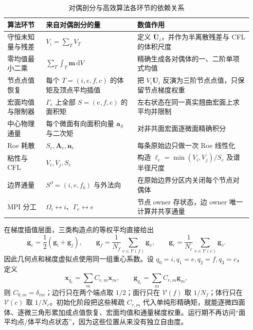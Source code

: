 \documentclass[UTF8,a4paper,11pt,openany]{ctexrep}
\numberwithin{equation}{chapter}
\newcommand{\dd}{\,\mathrm d}
\newcommand{\Ubar}{\overline{\bm U}}
\begin{document}
\begin{table}[htbp]
\centering
\caption{对偶剖分与高效算法各环节的依赖关系}
\label{tab:dual-dependency}
\begin{tabularx}{\textwidth}{>{\raggedright\arraybackslash}p{}X X}
\toprule
算法环节 & 来自对偶剖分的量 & 数值作用\\
\midrule
守恒未知量与残差 & $V_i=\sum_TV_T$ & 定义 $\Ubar_i$，并作为半离散残差与 CFL 的体积尺度\\
零均值最小二乘 & $\sum_T\int_T\bm m\dd V$ & 精确生成各对偶体的一、二阶单项式均值\\
节点点值恢复 & 每个 $T=(i,e,f,c)$ 的体矩及顶点平均插值 & 把 $V_i\Ubar_i$ 反演为三阶节点点值，只保留节点梯度权重\\
宏面均值与限制器 & $\Gamma_e$ 上全部 $S=(e,f,c)$ 的面积矩 & 左右状态在同一真实翘曲宏面上求平均并限制\\
中心物理通量 & 每个微面有向面积向量 $\bm a_S$ 与二次矩 & 对非共面宏面逐微面精确积分\\
Roe 耗散 & $S_e,\bm A_e,\bm n_e$ & 每条原始边只做一次 Roe 线性化\\
粘性与 CFL & $V_i,V_j,S_e$ & 构造 $\ell_e=\min(V_i,V_j)/S_e$ 及谱半径尺度\\
边界通量 & $S^\partial=(i,e,f_b)$ 与外法向 & 在原始边界分区内关闭每个节点对偶体\\
MPI 分工 & $\Omega_i\leftrightarrow i$、$\Gamma_e\leftrightarrow e$ & 节点 owner 存状态，边 owner 唯一计算并共享通量\\
\bottomrule
\end{tabularx}
\end{table}

在梯度插值层面，三类构造点的等权平均直接给出
\begin{equation}
  \bm g_e=\frac12(\bm g_i+\bm g_j),\qquad
  \bm g_f=\frac1{N_f}\sum_{v\in\mathcal V(f)}\bm g_v,
  \qquad
  \bm g_c=\frac1{N_c}\sum_{v\in\mathcal V(c)}\bm g_v.
  \label{eq:construction-gradient-interpolation}
\end{equation}
因此几何点和梯度虚拟点使用同一组重心系数。设 $q_0=i,q_1=e,q_2=f,q_3=c$，定义
\begin{equation}
  \bm x_{q_r}=\sum_m C_{r,m}\bm x_m,\qquad
  \bm g_{q_r}=\sum_m C_{r,m}\bm g_m,
\end{equation}
则 $C_{0,m}=\delta_{im}$；边行只在两个端点取 $1/2$；面行只在 $\mathcal V(f)$ 取 $1/N_f$；体行只在 $\mathcal V(c)$ 取 $1/N_c$。初始化阶段把这些稀疏 $C_{r,m}$ 代入单纯形精确矩，就能逐微四面体、逐微三角形累加成点值恢复、宏面均值和通量梯度权重。运行期不再访问“面平均点/体平均点状态”，因为这些位置从来没有独立自由度。
\end{document}
